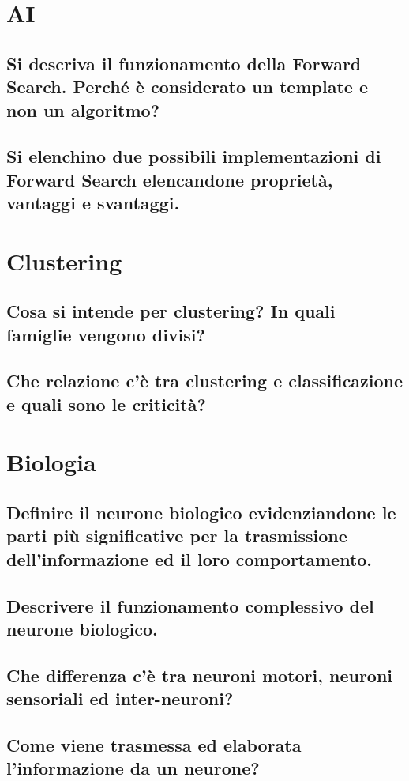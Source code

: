 \documentclass[\main/main.tex]{subfiles}
\begin{document}
\section{AI}

\subsection{Si descriva il funzionamento della Forward Search.  Perché è considerato un template e non un algoritmo?}
\subsection{Si elenchino due possibili implementazioni di Forward Search elencandone proprietà, vantaggi e svantaggi.}

\section{Clustering}

\subsection{Cosa si intende per clustering? In quali famiglie vengono divisi?}
\subsection{Che relazione c'è tra clustering e classificazione e quali sono le criticità?}

\section{Biologia}

\subsection{Definire il neurone biologico evidenziandone le parti più significative per la trasmissione dell'informazione ed il loro comportamento.}
\subsection{Descrivere il funzionamento complessivo del neurone biologico.}
\subsection{Che differenza c'è tra neuroni motori, neuroni sensoriali ed inter-neuroni?}
\subsection{Come viene trasmessa ed elaborata l'informazione da un neurone?}
\end{document}
